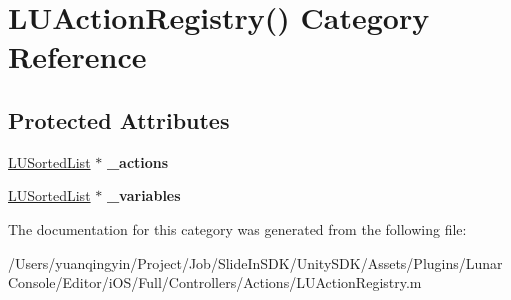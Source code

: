 \hypertarget{category_l_u_action_registry_07_08}{}\section{L\+U\+Action\+Registry() Category Reference}
\label{category_l_u_action_registry_07_08}
\subsection*{Protected Attributes}
\begin{DoxyCompactItemize}
\item 
\mbox{\label{category_l_u_action_registry_07_08_a6acc76d318b31a1f353f043bfd59ec6a}} 
\mbox{\hyperlink{interface_l_u_sorted_list}{L\+U\+Sorted\+List}} $\ast$ {\bfseries \+\_\+actions}
\item 
\mbox{\label{category_l_u_action_registry_07_08_ab53d7e89842c04c0469b9d1e80c7e730}} 
\mbox{\hyperlink{interface_l_u_sorted_list}{L\+U\+Sorted\+List}} $\ast$ {\bfseries \+\_\+variables}
\end{DoxyCompactItemize}


The documentation for this category was generated from the following file\+:\begin{DoxyCompactItemize}
\item 
/\+Users/yuanqingyin/\+Project/\+Job/\+Slide\+In\+S\+D\+K/\+Unity\+S\+D\+K/\+Assets/\+Plugins/\+Lunar\+Console/\+Editor/i\+O\+S/\+Full/\+Controllers/\+Actions/L\+U\+Action\+Registry.\+m\end{DoxyCompactItemize}
